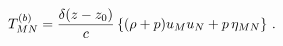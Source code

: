 \begin{equation}\label{em}
T^{(b)} _{MN} = {{\delta (z-z_0)} \over c} \left\{ (\rho +p) u_M u_N +
p \, \eta_{MN} \right\}\, .
\end{equation}

